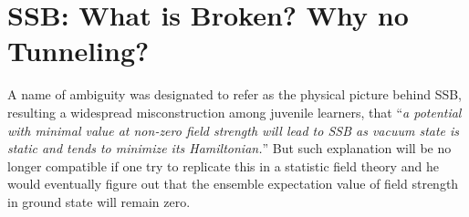 \section[When do Symmetries Break Spontaneously]{SSB: What is Broken? Why no Tunneling?}

A name of ambiguity was designated to refer as the physical picture behind SSB, resulting a widespread misconstruction among juvenile learners, that ``\emph{a potential with minimal value at non-zero field strength will lead to SSB as vacuum state is static and tends to minimize its Hamiltonian.}'' But such explanation will be no longer compatible if one try to replicate this in a statistic field theory and he would eventually figure out that the ensemble expectation value of field strength in ground state will remain zero. 